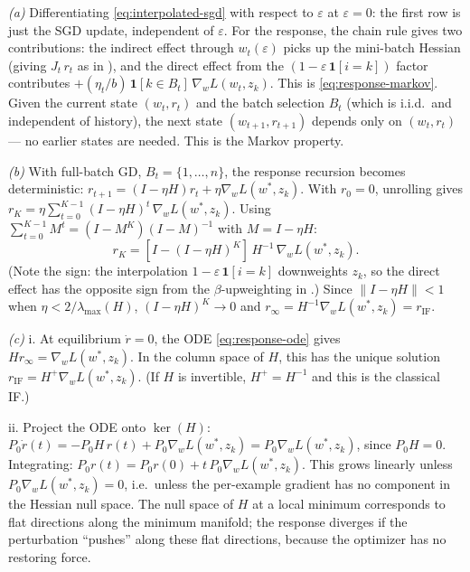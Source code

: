 \begin{solution}[ex:unroll-to-if]

\textit{(a)} Differentiating \eqref{eq:interpolated-sgd} with respect to $\varepsilon$ at $\varepsilon = 0$: the first row is just the SGD update, independent of $\varepsilon$. For the response, the chain rule gives two contributions: the indirect effect through $w_t(\varepsilon)$ picks up the mini-batch Hessian (giving $J_t\,r_t$ as in ), and the direct effect from the $(1-\varepsilon\,\mathbf{1}[i=k])$ factor contributes $+(\eta_t/b)\,\mathbf{1}[k\in B_t]\,\nabla_w L(w_t,z_k)$. This is \eqref{eq:response-markov}. Given the current state $(w_t,r_t)$ and the batch selection $B_t$ (which is i.i.d.\ and independent of history), the next state $(w_{t+1},r_{t+1})$ depends only on $(w_t,r_t)$ --- no earlier states are needed. This is the Markov property.

\textit{(b)} With full-batch GD, $B_t = \{1,\dots,n\}$, the response recursion becomes deterministic: $r_{t+1} = (I-\eta H)r_t + \eta\nabla_w L(w^*,z_k)$. With $r_0 = 0$, unrolling gives $r_K = \eta\sum_{t=0}^{K-1}(I-\eta H)^t\,\nabla_w L(w^*,z_k)$. Using $\sum_{t=0}^{K-1}M^t = (I-M^K)(I-M)^{-1}$ with $M = I-\eta H$:
\[
  r_K = [I-(I-\eta H)^K]\,H^{-1}\,\nabla_w L(w^*,z_k).
\]
(Note the sign: the interpolation $1-\varepsilon\,\mathbf{1}[i=k]$ downweights $z_k$, so the direct effect has the opposite sign from the $\beta$-upweighting in .) Since $\|I-\eta H\| < 1$ when $\eta < 2/\lambda_{\max}(H)$, $(I-\eta H)^K \to 0$ and $r_\infty = H^{-1}\nabla_w L(w^*,z_k) = r_{\mathrm{IF}}$.

\textit{(c)} i. At equilibrium $\dot r = 0$, the ODE \eqref{eq:response-ode} gives $Hr_\infty = \nabla_w L(w^*,z_k)$. In the column space of $H$, this has the unique solution $r_{\mathrm{IF}} = H^+\nabla_w L(w^*,z_k)$. (If $H$ is invertible, $H^+ = H^{-1}$ and this is the classical IF.)

ii. Project the ODE onto $\ker(H)$: $P_0\dot{r}(t) = -P_0 H\,r(t) + P_0\nabla_w L(w^*,z_k) = P_0\nabla_w L(w^*,z_k)$, since $P_0 H = 0$. Integrating: $P_0 r(t) = P_0 r(0) + t\,P_0\nabla_w L(w^*,z_k)$. This grows linearly unless $P_0\nabla_w L(w^*,z_k) = 0$, i.e.\ unless the per-example gradient has no component in the Hessian null space. The null space of $H$ at a local minimum corresponds to flat directions along the minimum manifold; the response diverges if the perturbation ``pushes'' along these flat directions, because the optimizer has no restoring force.

\end{solution}

